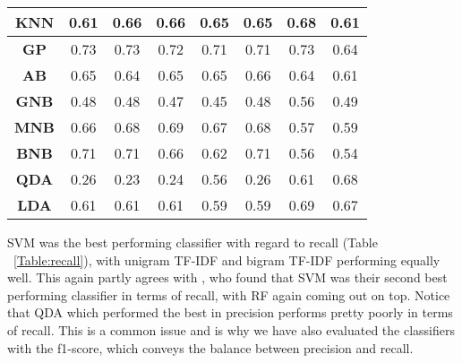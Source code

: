 \begin{table}[h!]
{\begin{tabular}{cccccccc}
\rowcolor[HTML]{EFEFEF} 
\textbf{KNN} & 0.61 & 0.66 & 0.66 & 0.65 & 0.65 & 0.68 & 0.61  \\ \hline
\textbf{GP} & 0.73 & 0.73 & 0.72 & 0.71 & 0.71 & 0.73 & 0.64  \\ \hline
\rowcolor[HTML]{EFEFEF} 
\textbf{AB} & 0.65 & 0.64 & 0.65 & 0.65 & 0.66 & 0.64 & 0.61  \\ \hline
\textbf{GNB} & 0.48 & 0.48 & 0.47 & 0.45 & 0.48 & 0.56 & 0.49  \\ \hline
\rowcolor[HTML]{EFEFEF} 
\textbf{MNB} & \multicolumn{1}{c}{\cellcolor[HTML]{EFEFEF}0.66} & 0.68 & 0.69 & 0.67 & 0.68 & 0.57 & 0.59  \\ \hline
\rowcolor[HTML]{FFFFFF} 
\textbf{BNB} & 0.71 & 0.71 & 0.66 & 0.62 & 0.71 & 0.56 & 0.54  \\ \hline
\rowcolor[HTML]{EFEFEF} 
\textbf{QDA} & 0.26 & 0.23 & 0.24 & 0.56 & 0.26 & 0.61 & 0.68  \\ \hline
\rowcolor[HTML]{FFFFFF} 
\textbf{LDA} & 0.61 & 0.61 & 0.61 & 0.59 & 0.59 & 0.69 & 0.67  \\ \hline
\end{tabular}}
\end{table}

SVM was the best performing classifier with regard to recall (Table ~\ref{Table:recall}), with unigram TF-IDF and bigram TF-IDF performing equally well. This again partly agrees with \cite{Rane2018}, who found that SVM was their second best performing classifier in terms of recall, with RF again coming out on top. Notice that QDA which performed the best in precision performs pretty poorly in terms of recall. This is a common issue and is why we have also evaluated the classifiers with the f1-score, which conveys the balance between precision and recall.

